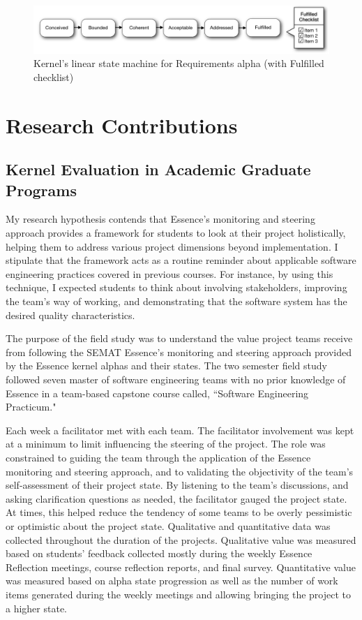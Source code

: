 \documentclass[preprint,12pt,3p]{elsarticle}
\begin{document}
\begin{figure}[h]\vspace*{4pt}
\centerline{\includegraphics[width=5.4in]{kernel_images/StateMachineRequirements}}
\caption{Kernel's linear state machine for Requirements alpha (with Fulfilled checklist)}\vspace*{-6pt}\label{StateMachine}
\end{figure}

\section{Research Contributions}

\subsection{Kernel Evaluation in Academic Graduate Programs}
\label{CMUFieldStudy}
My research hypothesis contends that Essence's monitoring and steering approach provides a framework for students to look at their project holistically, helping them to address various project dimensions beyond implementation. I stipulate that the framework acts as a routine reminder about applicable software engineering practices covered in previous courses. For instance, by using this technique, I expected students to think about involving stakeholders, improving the team's way of working, and demonstrating that the software system has the desired quality characteristics.

The purpose of the field study \cite{ICSE2014} was to understand the value project teams receive from following the SEMAT Essence's monitoring and steering approach provided by the Essence kernel alphas and their states.  The two semester field study followed seven master of software engineering teams with no prior knowledge of Essence in a team-based capstone course called, ``Software Engineering Practicum." 

Each week a facilitator met with each team. The facilitator involvement was kept at a minimum to limit influencing the steering of the project. The role was constrained to guiding the team through the application of the Essence monitoring and steering approach, and to validating the objectivity of the team's self-assessment of their project state. By listening to the team's discussions, and asking clarification questions as needed, the facilitator gauged the project state. At times, this helped reduce the tendency of some teams to be overly pessimistic or optimistic about the project state. Qualitative and quantitative data was collected throughout the duration of the projects. Qualitative value was measured based on students' feedback collected mostly during the weekly Essence Reflection meetings, course reflection reports, and final survey. Quantitative value was measured based on alpha state progression as well as the number of work items generated during the weekly meetings and allowing bringing the project to a higher state.
\end{document}
